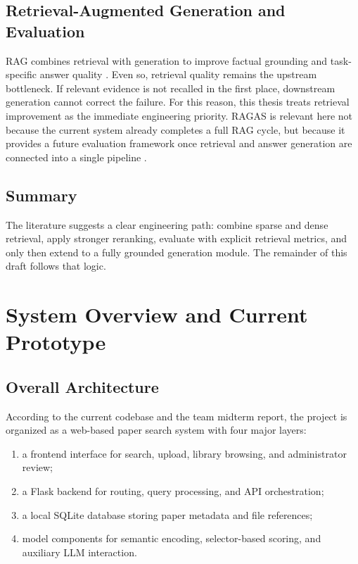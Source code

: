 \documentclass[11pt,a4paper,oneside]{report}
\begin{document}
\section{Retrieval-Augmented Generation and Evaluation}

RAG combines retrieval with generation to improve factual grounding and task-specific
answer quality \cite{lewis2020}. Even so, retrieval quality remains the upstream
bottleneck. If relevant evidence is not recalled in the first place, downstream
generation cannot correct the failure. For this reason, this thesis treats retrieval
improvement as the immediate engineering priority. RAGAS is relevant here not because
the current system already completes a full RAG cycle, but because it provides a
future evaluation framework once retrieval and answer generation are connected into a
single pipeline \cite{ragas2023}.

\section{Summary}

The literature suggests a clear engineering path: combine sparse and dense retrieval,
apply stronger reranking, evaluate with explicit retrieval metrics, and only then
extend to a fully grounded generation module. The remainder of this draft follows
that logic.

\chapter{System Overview and Current Prototype}

\section{Overall Architecture}

According to the current codebase and the team midterm report, the project is
organized as a web-based paper search system with four major layers:

\begin{enumerate}
  \item a frontend interface for search, upload, library browsing, and administrator review;
  \item a Flask backend for routing, query processing, and API orchestration;
  \item a local SQLite database storing paper metadata and file references;
  \item model components for semantic encoding, selector-based scoring, and auxiliary
  LLM interaction.
\end{enumerate}
\end{document}
